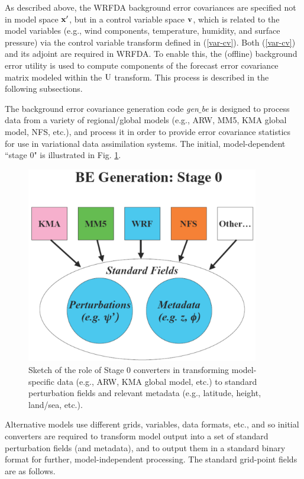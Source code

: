 As described above, the WRFDA background error covariances are specified not in 
model space ${\bf x'}$, but in a control variable space ${\bf v}$, which is related to the model variables 
(e.g., wind components, temperature, humidity, and surface pressure) via the control 
variable transform defined in (\ref{var-cv}). Both (\ref{var-cv}) and 
its adjoint are required in WRFDA. To enable this, the (offline) background error utility is used
to compute components of the forecast error covariance matrix modeled within the 
${\rm U}$ transform. This process is described in the following subsections.

The background error covariance generation code {\it gen$\_$be} is designed to process
data from a variety of regional/global models (e.g., ARW, MM5, KMA global model, 
NFS, etc.), and process it in order to provide error 
covariance statistics for use in variational data assimilation systems. The initial, 
model-dependent ``stage 0" is illustrated in Fig. \ref{var-genbe0}. 

%
%
\begin{figure}
  \centering
  \includegraphics[width=4.0in]{figures/var-genbe0.pdf}
  \caption{\label{var-genbe0}Sketch of the role of Stage 0 converters 
  in transforming model-specific data (e.g., ARW, KMA global model, etc.) to standard 
  perturbation fields and relevant metadata (e.g., latitude, height, land/sea, etc.).}
\end{figure}

Alternative models use different grids, variables, data formats, etc., and so initial converters 
are required to transform model output into a set of standard perturbation fields (and metadata), 
and to output them in a standard binary format for further, model-independent processing. The 
standard grid-point fields are as follows.

